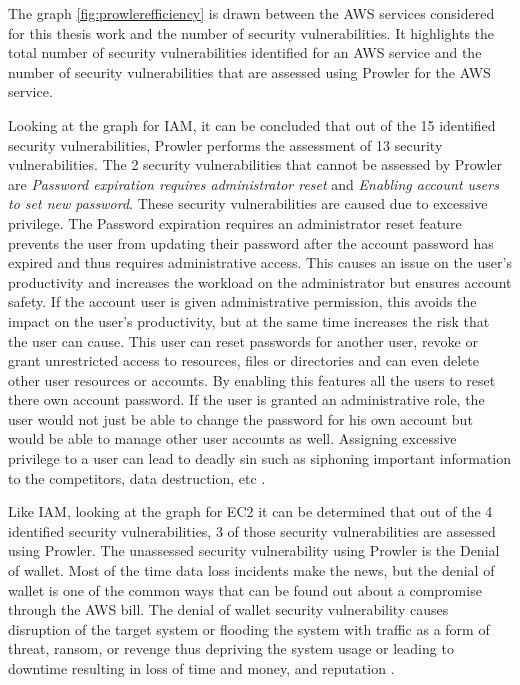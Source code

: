 \par The graph \ref{fig:prowlerefficiency} is drawn between the AWS services considered for this thesis work and the number of security vulnerabilities.
It highlights the total number of security vulnerabilities identified for an AWS service and the number of security vulnerabilities that are assessed using Prowler for the AWS service.

\par Looking at the graph for IAM, it can be concluded that out of the 15 identified security vulnerabilities, Prowler performs the assessment of 13 security vulnerabilities.
The 2 security vulnerabilities that cannot be assessed by
Prowler are \textit{Password expiration requires
administrator reset} and \textit{Enabling account users
to set new password}.
These security vulnerabilities are caused due to excessive privilege.
The Password expiration requires an administrator reset feature prevents the user from updating their password after the account password has expired and thus requires administrative access.
This causes an issue on the user’s productivity and increases the workload on the administrator but ensures account safety.
If the account user is given administrative permission, this avoids the impact on the user’s productivity, but at the same time increases the risk that the user can cause.
This user can reset passwords for another user, revoke or grant unrestricted access to resources, files or directories and can even delete other user resources or accounts.
By enabling this features all the users to reset there
own account password.
If the user is granted an administrative role, the user would not just be able to change the password for his own account but would be able to manage other user accounts as well.
Assigning excessive privilege to a user can lead to 
deadly sin such as siphoning important information to the
competitors, data destruction, etc \cite{89}.

\par Like IAM, looking at the graph for EC2 it can be determined that out of the 4 identified security vulnerabilities, 3 of those security vulnerabilities are assessed using Prowler.
 The unassessed security vulnerability using Prowler is the Denial of wallet.
 Most of the time data loss incidents make the news, but the denial of wallet is one of the common ways that can be found out about a compromise through the AWS bill.
 The denial of wallet security vulnerability causes 
disruption of the target system or flooding the system 
with traffic as a form of threat, ransom, or revenge thus
depriving the system usage or leading to downtime 
resulting in loss of time and money, and reputation
\cite{90}.

